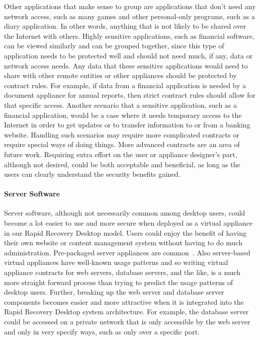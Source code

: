 Other applications that make sense to group are applications that don't need any network access, such as many games and other personal-only programs, such as a diary application. In other words, anything that is not likely to be shared over the Internet with others. Highly sensitive applications, such as financial software, can be viewed similarly and can be grouped together, since this type of application needs to be protected well and should not need much, if any, data or network access needs. Any data that these sensitive applications would need to share with other remote entities or other appliances should be protected by contract rules. For example, if data from a financial application is needed by a document appliance for annual reports, then strict contract rules should allow for that specific access. Another scenario that a sensitive application, such as a financial application, would be a case where it needs temporary access to the Internet in order to get updates or to transfer information to or from a banking website. Handling such scenarios may require more complicated contracts or require special ways of doing things. More advanced contracts are an area of future work. Requiring extra effort on the user or appliance designer's part, although not desired, could be both acceptable and beneficial, as long as the users can clearly understand the security benefits gained.

\paragraph{Server Software}

Server software, although not necessarily common among desktop users, could become a lot easier to use and more secure when deployed as a virtual appliance in our Rapid Recovery Desktop model. Users could enjoy the benefit of having their own website or content management system without having to do much administration. Pre-packaged server appliances are common~\cite{vmware_appliances_website, rPath_website, stacklet_website, virtual_appliances_website, jumpbox_website}. Also server-based virtual appliances have well-known usage patterns and so writing virtual appliance contracts for web servers, database servers, and the like, is a much more straight forward process than trying to predict the usage patterns of desktop users. Further, breaking up the web server and database server components becomes easier and more attractive when it is integrated into the Rapid Recovery Desktop system architecture. For example, the database server could be accessed on a private network that is only accessible by the web server and only in very specify ways, such as only over a specific port. 

